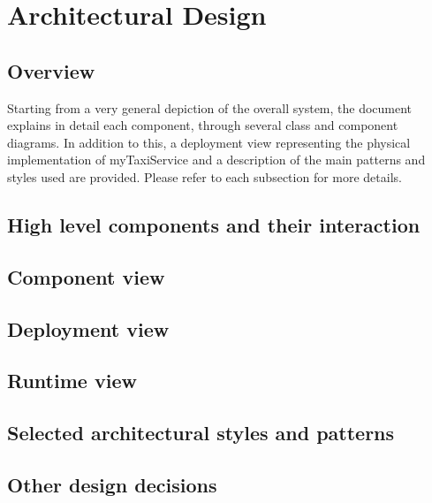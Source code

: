 \pagebreak
\section{Architectural Design}
 
\subsection{Overview}
Starting from a very general depiction of the overall system, the document explains in detail each component, through several class and component diagrams. In addition to this, a deployment view representing the physical implementation of myTaxiService and a description of the main patterns and styles used are provided. Please refer to each subsection for more details.
\subsection{High level components and their interaction}
\subsection{Component view}
\subsection{Deployment view}
\subsection{Runtime view}
\subsection{Selected architectural styles and patterns}
\subsection{Other design decisions}
